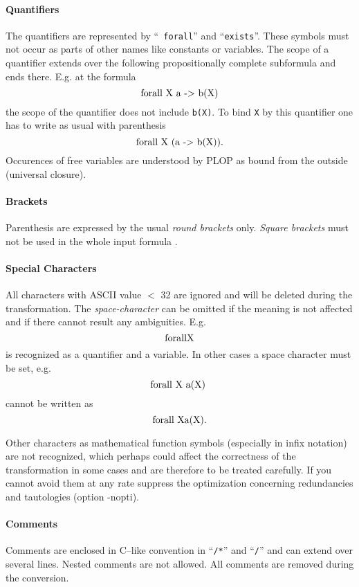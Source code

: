 \paragraph{Quantifiers}
The quantifiers are represented by
``{\tt
forall}'' and ``{\tt exists}''.
These symbols must not occur as parts of other names like constants
or variables.
The scope of a quantifier extends over the following propositionally 
complete subformula and ends there.
E.g. at the formula
\[\tt 
\mbox{forall X a -> b(X)}  \\
\rm
\]
the scope of the quantifier does not include {\tt b(X)}.
To bind {\tt X} by this quantifier one has to write as usual with parenthesis
\[\tt 
\mbox{forall X (a -> b(X)).}\\
\rm
\]
Occurences of free variables are understood by PLOP as bound
from the outside (universal closure).

\paragraph{Brackets}
Parenthesis are expressed by the usual {\em round brackets} only.
{\em Square brackets} must not be used in the whole input formula .

\paragraph{Special Characters}
All characters with ASCII value $<$ 32 are ignored and will be deleted
during the transformation.
The {\em space-character} can be omitted if the meaning is not affected and if
there cannot result any ambiguities. 
E.g. 
\[\tt 
\mbox{forallX} \\
\rm
\]
is recognized as a quantifier and a variable. 
In other cases a space character must be set, e.g.
\[\tt 
\mbox{forall X a(X) }\\
\rm
\]
cannot be written as 
\[ \tt 
\mbox{forall Xa(X).}\\
\rm
\]


Other characters as mathematical function symbols (especially in
infix notation) are not recognized, which perhaps could affect the
correctness of the transformation in some cases and are therefore to 
be treated carefully. 
If you cannot avoid 
them at any rate suppress the optimization concerning redundancies
and tautologies (option -nopti). 

\paragraph{Comments}
Comments are enclosed in C--like convention in ``{\tt /*}'' and ``{\tt */}''
and can extend over several lines. Nested comments are not allowed.
All comments are removed during the conversion.


